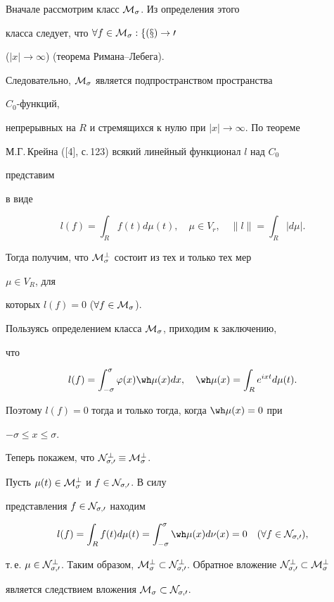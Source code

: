 \begin{pf} 


Вначале рассмотрим класс $\cal M_\sigma$. Из определения этого 


класса следует, что $\forall f\in\cal M_\sigma:f(x)\to0$ 


($|x|\to\infty$) (теорема Римана--Лебега). 


Следовательно, $\cal M_\sigma$ является подпространством пространства 


$C_0$-функций, 


непрерывных на $R$ и стремящихся к нулю при $|x|\to\infty$. По теореме 


М.Г.\,Крейна ([4], с.\,123) всякий линейный функционал $l$ над $C_0$ 


представим 


в виде 


$$ 


l(f)=\int_R f(t)d\mu(t),\quad \mu\in V_r,\quad 


\|l\|=\int_R|d\mu|. 


$$ 


Тогда получим, что $\cal M^\bot_\sigma$ состоит из тех и только тех мер 


$\mu\in V_R$, для 


которых $l(f)=0$ ($\forall f\in\cal M_\sigma$). 


 


Пользуясь определением класса $\cal M_\sigma$, приходим к заключению, 


что 


$$ 


l(f)=\int^\sigma_{-\sigma}\varphi(x)\wh\mu(x)dx,\quad 


\wh\mu(x)=\int_R e^{ixt}d\mu(t). 


$$ 


Поэтому $l(f)=0$ тогда и только тогда, когда $\wh\mu(x)=0$ при 


$-\sigma\le x\le\sigma$. 


 


Теперь покажем, что $\cal N^\bot_{\sigma,0}\equiv\cal M^\bot_\sigma$. 


Пусть $\mu(t)\in\cal M^\bot_\sigma$ и $f\in\cal N_{\sigma,0}$. В силу 


представления $f\in\cal N_{\sigma,0}$ находим 


$$ 


l(f)=\int_R f(t)d\mu(t)=\int^\sigma_{-\sigma} 


\wh\mu(x)d\nu(x)=0\quad (\forall f\in\cal N_{\sigma,0}), 


$$ 


т.\,е. $\mu\in\cal N^\bot_{\sigma,0}$. Таким образом, $\cal 


M^\bot_\sigma\subset\cal N^\bot_{\sigma,0}$. Обратное вложение $\cal 


N^\bot_{\sigma,0}\subset\cal M^\bot_\sigma$ 


является следствием вложения $\cal M_\sigma\subset\cal N_{\sigma,0}$. 


\end{pf} 


